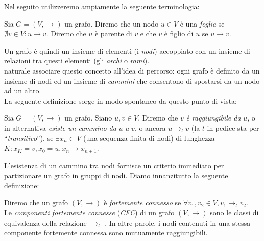 Nel seguito utilizzeremo ampiamente la seguente terminologia:
\begin{definition}
    Sia $G = (V,\to)$ un grafo. Diremo che un nodo $u \in V$ è una \emph{foglia} se $\nexists v \in V : u \to v$. Diremo che $u$ è parente di $v$ e che $v$ è figlio di $u$ se $u \to v$.
\end{definition}
Un grafo è quindi un insieme di elementi (i \emph{nodi}) accoppiato con un insieme di relazioni tra questi elementi (gli \emph{archi} o \emph{rami}).\\
\accente naturale associare questo concetto all'idea di percorso: ogni grafo è definito da un insieme di nodi ed un insieme di \emph{cammini} che consentono di spostarsi da un nodo ad un altro.\\
La seguente definizione sorge in modo spontaneo da questo punto di vista:
\begin{definition}
    Sia $G = (V, \to)$ un grafo. Siano $u,v \in V$. Diremo che $v$ \emph{è raggiungibile da} $u$, o in alternativa \emph{esiste un cammino da} $u$ \emph{a} $v$, o ancora $u \to_t v$ (la $t$ in pedice sta per ``\emph{transitivo}''), se
    $\exists x_n \subset V$ (una sequenza finita di nodi) di lunghezza $K : x_K = v, x_0 = u, x_n \to x_{n+1}$.
\end{definition}
L'esistenza di un cammino tra nodi fornisce un criterio immediato per partizionare un grafo in gruppi di nodi. Diamo innanzitutto la seguente definizione:
\begin{definition}
    Diremo che un grafo $(V,\to)$ è \emph{fortemente connesso} se $\forall v_1, v_2 \in V, v_1 \to_t v_2$.\\
    Le \emph{componenti fortemente connesse} (\emph{CFC}) di un grafo $(V,\to)$ sono le classi di equivalenza della relazione $\to_t$ \cite[Appendice B]{clrs}. In altre parole, i nodi contenuti in una stessa componente fortemente connessa sono mutuamente raggiungibili.
\end{definition}
